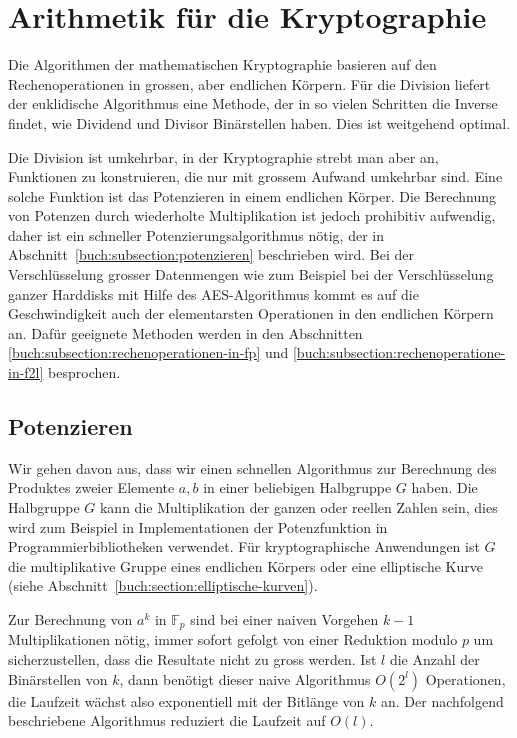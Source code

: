 %
%
%
\section{Arithmetik für die Kryptographie
\label{buch:section:arithmetik-fuer-kryptographie}}
Die Algorithmen der mathematischen Kryptographie basieren
auf den Rechenoperationen in grossen, aber endlichen Körpern.
Für die Division liefert der euklidische Algorithmus eine
Methode, der in so vielen Schritten die Inverse findet,
wie Dividend und Divisor Binärstellen haben.
Dies ist weitgehend optimal.

Die Division ist umkehrbar, in der Kryptographie strebt man aber an,
Funktionen zu konstruieren, die nur mit grossem Aufwand umkehrbar sind.
Eine solche Funktion ist das Potenzieren in einem endlichen Körper.
Die Berechnung von Potenzen durch wiederholte Multiplikation ist jedoch
prohibitiv aufwendig, daher ist ein schneller Potenzierungsalgorithmus
nötig, der in Abschnitt~\ref{buch:subsection:potenzieren} beschrieben
wird.
Bei der Verschlüsselung grosser Datenmengen wie zum Beispiel bei
der Verschlüsselung ganzer Harddisks mit Hilfe des AES-Algorithmus
kommt es auf die Geschwindigkeit auch der elementarsten Operationen
in den endlichen Körpern an.
Dafür geeignete Methoden werden in den Abschnitten
\ref{buch:subsection:rechenoperationen-in-fp}
und
\ref{buch:subsection:rechenoperatione-in-f2l}
besprochen.

\subsection{Potenzieren
\label{buch:subsection:potenzieren}}
Wir gehen davon aus, dass wir einen schnellen Algorithmus zur
Berechnung des Produktes zweier Elemente $a,b$ in einer
beliebigen Halbgruppe $G$ haben.
Die Halbgruppe $G$ kann die Multiplikation der ganzen oder reellen Zahlen
sein, dies wird zum Beispiel in Implementationen der Potenzfunktion
in Programmierbibliotheken verwendet.
Für kryptographische Anwendungen ist $G$ die multiplikative Gruppe
eines endlichen Körpers oder eine elliptische Kurve
(siehe Abschnitt~\ref{buch:section:elliptische-kurven}).

Zur Berechnung von $a^k$ in $\mathbb{F}_p$ sind bei einer naiven Vorgehen
$k-1$ Multiplikationen nötig, immer sofort gefolgt
von einer Reduktion modulo $p$ um sicherzustellen, dass die Resultate
nicht zu gross werden.
Ist $l$ die Anzahl der Binärstellen von $k$, dann benötigt dieser
naive Algorithmus $O(2^l)$ Operationen, die Laufzeit wächst
also exponentiell mit der Bitlänge von $k$ an.
Der nachfolgend beschriebene Algorithmus reduziert die Laufzeit auf
$O(l)$.

